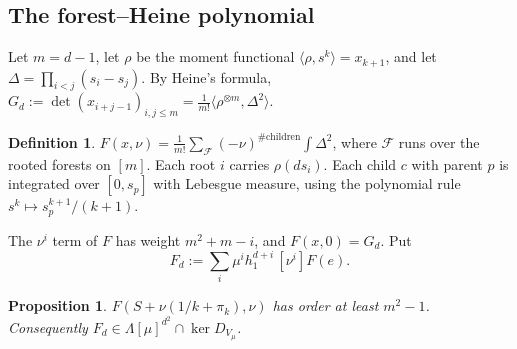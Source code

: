 \documentclass[11pt]{article}
\newtheorem{proposition}[theorem]{Proposition}
\theoremstyle{definition}
\newtheorem{definition}[theorem]{Definition}
\theoremstyle{remark}
\newcommand{\La}{\Lambda}
\begin{document}
\subsection{The forest--Heine polynomial}

Let $m=d-1$, let $\rho$ be the moment functional $\langle\rho,s^k\rangle=x_{k+1}$, and let
$\Delta=\prod_{i<j}(s_i-s_j)$. By Heine's formula, $G_d:=\det(x_{i+j-1})_{i,j\le m}=\frac1{m!}\langle\rho^{\otimes
m},\Delta^2\rangle$.

\begin{definition}
$F(x,\nu)=\frac1{m!}\sum_{\mathcal F}(-\nu)^{\#\mathrm{children}}\int\Delta^2$, where $\mathcal F$ runs over the
rooted forests on $[m]$. Each root $i$ carries $\rho(ds_i)$. Each child $c$ with parent $p$ is integrated over
$[0,s_p]$ with Lebesgue measure, using the polynomial rule $s^k\mapsto s_p^{k+1}/(k+1)$.
\end{definition}

The $\nu^i$ term of $F$ has weight $m^2+m-i$, and $F(x,0)=G_d$. Put
\[
  F_d:=\sum_i\mu^ih_1^{d+i}\,[\nu^i]F(e).
\]

\begin{proposition}\label{Fprop}
$F(S+\nu(1/k+\pi_k),\nu)$ has order at least $m^2-1$. Consequently $F_d\in\La[\mu]^{d^2}\cap\ker D_{V_\mu}$.
\end{proposition}
\end{document}
